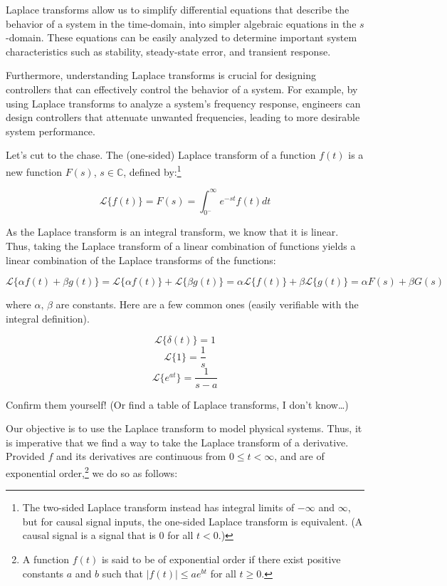 \documentclass{report}
\begin{document}
\begin{onehalfspacing}
\begin{flushleft}
\medskip

Laplace transforms allow us to simplify differential equations that describe the behavior of a system in the time-domain, into simpler algebraic equations in the \(s\)-domain. These equations can be easily analyzed to determine important system characteristics such as stability, steady-state error, and transient response.

\medskip

Furthermore, understanding Laplace transforms is crucial for designing controllers that can effectively control the behavior of a system. For example, by using Laplace transforms to analyze a system's frequency response, engineers can design controllers that attenuate unwanted frequencies, leading to more desirable system performance.

\medskip

Let's cut to the chase. The (one-sided) Laplace transform of a function \(f(t)\) is a new function \(F(s)\), \(s \in \mathbb{C}\), defined by:\footnote{The two-sided Laplace transform instead has integral limits of \(-\infty\) and \(\infty\), but for causal signal inputs, the one-sided Laplace transform is equivalent. (A causal signal is a signal that is 0 for all \(t<0\).)}

\vspace{-0.1in}
\[\mathscr{L} \{ f(t) \} = F(s) = \int_{0^-} ^\infty e^{-st} f(t) dt\]

As the Laplace transform is an integral transform, we know that it is linear. Thus, taking the Laplace transform of a linear combination of functions yields a linear combination of the Laplace transforms of the functions:

\vspace{-0.1in}
\[\mathscr{L} \{ \alpha f(t) + \beta g(t) \} = \mathscr{L} \{ \alpha f(t) \} + \mathscr{L} \{ \beta g(t) \} = \alpha \mathscr{L} \{ f(t) \} + \beta \mathscr{L} \{ g(t) \} = \alpha F(s) + \beta G(s)\]

where \(\alpha, \,\beta\) are constants. Here are a few common ones (easily verifiable with the integral definition).

\vspace{-0.1in}
\[\mathscr{L} \{ \delta(t) \} = 1\]
\[\mathscr{L} \{ 1 \} = \frac{1}{s}\]
\[\mathscr{L} \{ e^{at} \} = \frac{1}{s-a}\]

Confirm them yourself! (Or find a table of Laplace transforms, I don't know\dots)

\medskip

Our objective is to use the Laplace transform to model physical systems. Thus, it is imperative that we find a way to take the Laplace transform of a derivative. Provided \(f\) and its derivatives are continuous from \(0 \le t < \infty\), and are of exponential order,\footnote{A function \(f(t)\) is said to be of exponential order if there exist positive constants \(a\) and \(b\) such that \(|f(t)| \le ae^{bt}\) for all \(t\ge 0\).} we do so as follows:


\end{flushleft}
\end{onehalfspacing}
\end{document}
